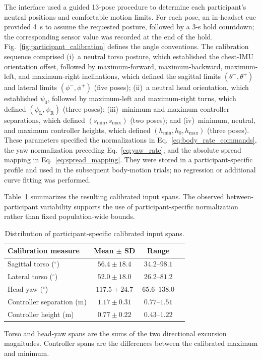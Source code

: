 \documentclass[conference, a4paper]{IEEEtran}
\begin{document}
The interface used a guided 13-pose procedure to determine each participant's
neutral positions and comfortable motion limits. For each pose, an in-headset
cue provided 4~s to assume the requested posture, followed by a 3-s hold
countdown; the corresponding sensor value was recorded at the end of the hold.
Fig.~\ref{fig:participant_calibration} defines the angle conventions. The calibration sequence comprised
(i)~a neutral torso posture, which established the chest-IMU orientation
offset, followed by maximum-forward, maximum-backward, maximum-left, and
maximum-right inclinations, which defined the sagittal limits
$(\theta^{-},\theta^{+})$ and lateral limits
$(\phi^{-},\phi^{+})$ (five poses);
(ii)~a neutral head orientation, which established $\psi_0$, followed by
maximum-left and maximum-right turns, which defined
$(\psi_{\mathrm{L}},\psi_{\mathrm{R}})$ (three poses);
(iii)~minimum and maximum controller separations, which defined
$(s_{\min},s_{\max})$ (two poses); and
(iv)~minimum, neutral, and maximum controller heights, which defined
$(h_{\min},h_0,h_{\max})$ (three poses).
These parameters specified the normalizations in
Eq.~\eqref{eq:body_rate_commands}, the yaw normalization preceding
Eq.~\eqref{eq:yaw_rate}, and the absolute spread mapping in
Eq.~\eqref{eq:spread_mapping}. They were stored in a participant-specific
profile and used in the subsequent body-motion trials; no regression or
additional curve fitting was performed.

Table~\ref{tab:calibration_summary} summarizes the resulting calibrated input
spans. The observed between-participant variability supports the use of
participant-specific normalization rather than fixed population-wide bounds.

\begin{table}[t]
\centering
\caption{Distribution of participant-specific calibrated input spans.}
\label{tab:calibration_summary}
\footnotesize
\setlength{\tabcolsep}{3.5pt}
\begin{tabular}{@{}lccc@{}}
\toprule
Calibration measure & Mean $\pm$ SD & Range \\
\midrule
Sagittal torso ($^\circ$)
     & $56.4 \pm 18.4$  & $34.2$--$98.1$  \\
Lateral torso ($^\circ$)
     & $52.0 \pm 18.0$  & $26.2$--$81.2$  \\
Head yaw ($^\circ$)
    & $117.5 \pm 24.7$ & $65.6$--$138.0$ \\
Controller separation (m)
    & $1.17 \pm 0.31$  & $0.77$--$1.51$  \\
Controller height (m)
    & $0.77 \pm 0.22$  & $0.43$--$1.22$  \\
\bottomrule
\end{tabular}

\vspace{1mm}
\parbox{\columnwidth}{\scriptsize
Torso and head-yaw spans are the sums of the two directional excursion
magnitudes. Controller spans are the differences between the calibrated
maximum and minimum.}
\end{table}
\end{document}
